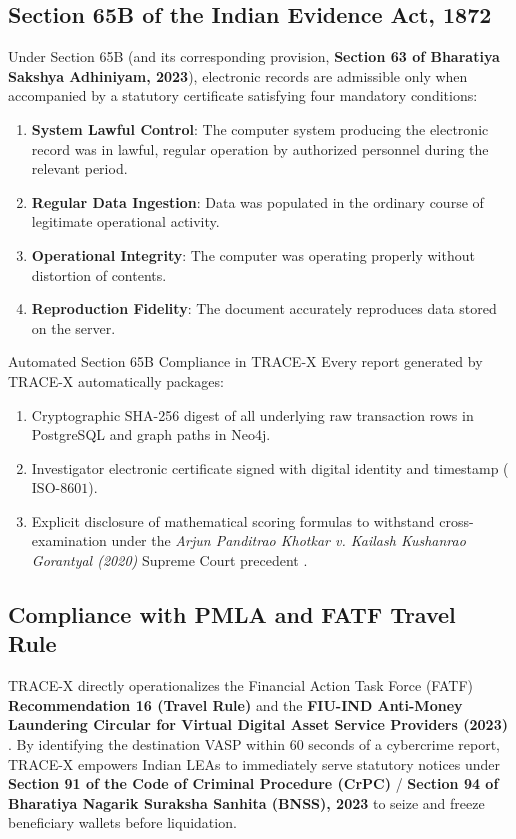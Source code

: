 \documentclass[10pt,twocolumn,a4paper]{article}
\begin{document}
\subsection{Section 65B of the Indian Evidence Act, 1872}
Under Section 65B (and its corresponding provision, \textbf{Section 63 of Bharatiya Sakshya Adhiniyam, 2023}), electronic records are admissible only when accompanied by a statutory certificate satisfying four mandatory conditions:
\begin{enumerate}[leftmargin=*]
    \item \textbf{System Lawful Control}: The computer system producing the electronic record was in lawful, regular operation by authorized personnel during the relevant period.
    \item \textbf{Regular Data Ingestion}: Data was populated in the ordinary course of legitimate operational activity.
    \item \textbf{Operational Integrity}: The computer was operating properly without distortion of contents.
    \item \textbf{Reproduction Fidelity}: The document accurately reproduces data stored on the server.
\end{enumerate}

\begin{statutebox}{Automated Section 65B Compliance in TRACE-X}
Every report generated by TRACE-X automatically packages:
\begin{enumerate}[leftmargin=*]
    \item Cryptographic SHA-256 digest of all underlying raw transaction rows in PostgreSQL and graph paths in Neo4j.
    \item Investigator electronic certificate signed with digital identity and timestamp ($\text{ISO-8601}$).
    \item Explicit disclosure of mathematical scoring formulas to withstand cross-examination under the \textit{Arjun Panditrao Khotkar v. Kailash Kushanrao Gorantyal (2020)} Supreme Court precedent \cite{anshul2020admissibility}.
\end{enumerate}
\end{statutebox}

\subsection{Compliance with PMLA and FATF Travel Rule}
TRACE-X directly operationalizes the Financial Action Task Force (FATF) \textbf{Recommendation 16 (Travel Rule)} \cite{fatf2021updated} and the \textbf{FIU-IND Anti-Money Laundering Circular for Virtual Digital Asset Service Providers (2023)} \cite{fiu_ind_2023}. By identifying the destination VASP within 60 seconds of a cybercrime report, TRACE-X empowers Indian LEAs to immediately serve statutory notices under \textbf{Section 91 of the Code of Criminal Procedure (CrPC)} / \textbf{Section 94 of Bharatiya Nagarik Suraksha Sanhita (BNSS), 2023} to seize and freeze beneficiary wallets before liquidation.
\end{document}
